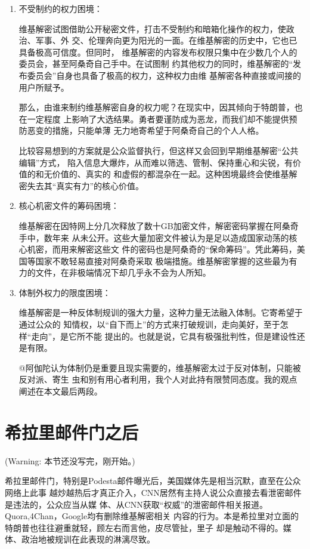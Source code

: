 \begin{enumerate}
\item 不受制约的权力困境：

  维基解密试图借助公开秘密文件，打击不受制约和暗箱化操作的权力，使政治、军事、外
  交、伦理奔向更为阳光的一面。在维基解密的历史中，它也已具备极高可信度。但同时，
  维基解密的内容发布权限只集中在少数几个人的委员会，甚至阿桑奇自己手中。在试图制
  约其他权力的同时，维基解密的“发布委员会”自身也具备了极高的权力，这种权力由维
  基解密各种直接或间接的用户所赋予。

  那么，由谁来制约维基解密自身的权力呢？在现实中，因其倾向于特朗普，也在一定程度
  上影响了大选结果。勇者要谨防成为恶龙，而我们却不能提供预防恶变的措施，只能单薄
  无力地寄希望于阿桑奇自己的个人人格。

  比较容易想到的方案就是公众监督执行，但这样又会回到早期维基解密“公共编辑”方式，
  陷入信息大爆炸，从而难以筛选、管制、保持重心和尖锐，有价值的和无价值的、真实的
  和虚假的都混杂在一起。这种困境最终会使维基解密失去其“真实有力”的核心价值。

\item 核心机密文件的筹码困境：

  维基解密在因特网上分几次释放了数十GB加密文件，解密密码掌握在阿桑奇手中，数年来
  从未公开。这些大量加密文件被认为是足以造成国家动荡的核心机密，而用来解密这些文
  件的密码也是阿桑奇的“保命筹码”。凭此筹码，美国等国家不敢轻易直接对阿桑奇采取
  极端措施。维基解密掌握的这些最为有力的文件，在非极端情况下却几乎永不会为人所知。

\item 体制外权力的限度困境：

  维基解密是一种反体制规训的强大力量，这种力量无法融入体制。它寄希望于通过公众的
  知情权，以“自下而上”的方式来打破规训，走向美好，至于怎样“走向”，是它所不能
  提出的。也就是说，它具有极强批判性，但是建设性还是有限。

  @阿伽陀认为体制仍是重要且现实需要的，维基解密太过于反对体制，只能被反对派、寄生
  虫和别有用心者利用，我个人对此持有限赞同态度。我的观点阐述在本文最后两段。
\end{enumerate}


\section{希拉里邮件门之后}
(Warning: 本节还没写完，刚开始。)

希拉里邮件门，特别是Podesta邮件曝光后，美国媒体先是相当沉默，直至在公众网络上此事
越炒越热后才真正介入，CNN居然有主持人说公众直接去看泄密邮件是违法的，公众应当从媒
体、从CNN获取“权威”的泄密邮件相关报道。Quora,4Chan，Google均有删除维基解密相关
内容的行为。本是希拉里对立面的特朗普也往往避重就轻，顾左右而言他，皮尽管扯，里子
却是触动不得的。媒体、政治地被规训在此表现的淋漓尽致。

